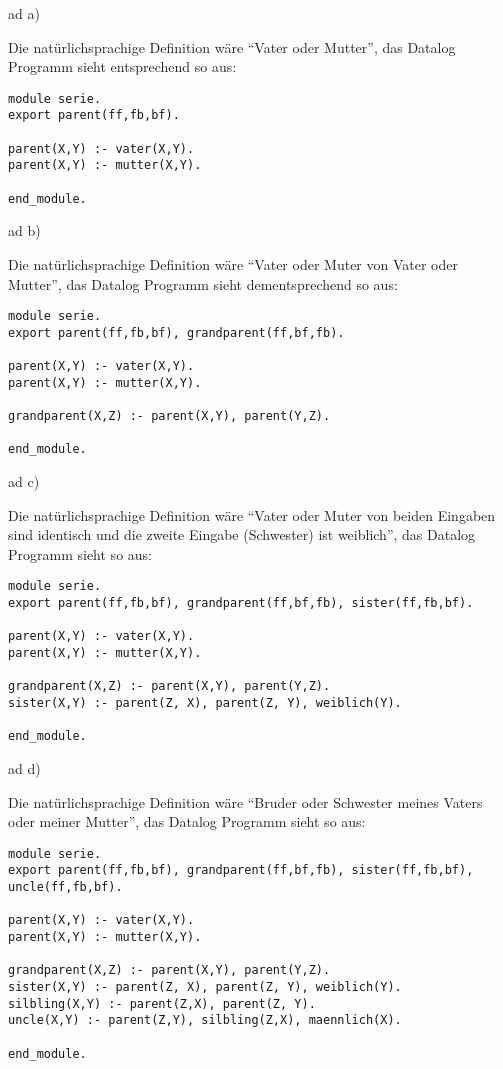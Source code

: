 \documentclass[12pt,a4paper]{amsart}
\begin{document}
ad a)

Die natürlichsprachige Definition wäre ``Vater oder Mutter'', das Datalog Programm sieht entsprechend so aus:

\begin{lstlisting}
module serie.
export parent(ff,fb,bf).

parent(X,Y) :- vater(X,Y).
parent(X,Y) :- mutter(X,Y).

end_module.
\end{lstlisting}

\medskip

ad b)

Die natürlichsprachige Definition wäre ``Vater oder Muter von Vater oder Mutter'', das Datalog Programm sieht dementsprechend so aus:

\begin{lstlisting}
module serie.
export parent(ff,fb,bf), grandparent(ff,bf,fb).

parent(X,Y) :- vater(X,Y).
parent(X,Y) :- mutter(X,Y).

grandparent(X,Z) :- parent(X,Y), parent(Y,Z).

end_module.
\end{lstlisting}

\medskip

ad c)

Die natürlichsprachige Definition wäre ``Vater oder Muter von beiden Eingaben sind identisch und die zweite Eingabe (Schwester) ist weiblich'', das Datalog Programm sieht so aus:

\begin{lstlisting}
module serie.
export parent(ff,fb,bf), grandparent(ff,bf,fb), sister(ff,fb,bf).

parent(X,Y) :- vater(X,Y).
parent(X,Y) :- mutter(X,Y).

grandparent(X,Z) :- parent(X,Y), parent(Y,Z).
sister(X,Y) :- parent(Z, X), parent(Z, Y), weiblich(Y).

end_module.
\end{lstlisting}

\medskip

ad d)

Die natürlichsprachige Definition wäre ``Bruder oder Schwester meines Vaters oder meiner Mutter'', das Datalog Programm sieht so aus:

\begin{lstlisting}
module serie.
export parent(ff,fb,bf), grandparent(ff,bf,fb), sister(ff,fb,bf), uncle(ff,fb,bf).

parent(X,Y) :- vater(X,Y).
parent(X,Y) :- mutter(X,Y).

grandparent(X,Z) :- parent(X,Y), parent(Y,Z).
sister(X,Y) :- parent(Z, X), parent(Z, Y), weiblich(Y).
silbling(X,Y) :- parent(Z,X), parent(Z, Y).
uncle(X,Y) :- parent(Z,Y), silbling(Z,X), maennlich(X).

end_module.
\end{lstlisting}
\end{document}
